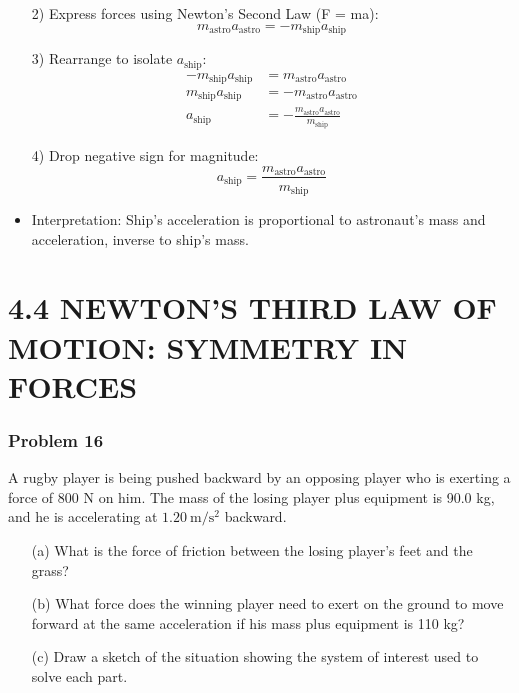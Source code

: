 \documentclass{beamer}
\begin{document}
\begin{}
\begin{frame}
\begin{itemize}
    \item[2)] Express forces using Newton's Second Law (F = ma):
    $$m_{\text{astro}} a_{\text{astro}} = -m_{\text{ship}} a_{\text{ship}}$$
    
    \item[3)] Rearrange to isolate $a_{\text{ship}}$:
    \begin{align*}
        -m_{\text{ship}} a_{\text{ship}} &= m_{\text{astro}} a_{\text{astro}} \\
        m_{\text{ship}} a_{\text{ship}} &= -m_{\text{astro}} a_{\text{astro}} \\
        a_{\text{ship}} &= -\frac{m_{\text{astro}} a_{\text{astro}}}{m_{\text{ship}}}
    \end{align*}
    
    \item[4)] Drop negative sign for magnitude:
    $$a_{\text{ship}} = \frac{m_{\text{astro}} a_{\text{astro}}}{m_{\text{ship}}}$$
    
    \item Interpretation: Ship's acceleration is proportional to astronaut's mass and acceleration, inverse to ship's mass.
\end{itemize}
\end{frame}

\section{4.4 NEWTON'S THIRD LAW OF MOTION: SYMMETRY IN FORCES}

\begin{frame}
\frametitle{Problem 16}
A rugby player is being pushed backward by an opposing player who is exerting a force of 800 N on him. The mass of the losing player plus equipment is 90.0 kg, and he is accelerating at $1.20 \mathrm{~m} / \mathrm{s}^{2}$ backward.
\begin{itemize}
    \item[(a)] What is the force of friction between the losing player's feet and the grass?
    \item[(b)] What force does the winning player need to exert on the ground to move forward at the same acceleration if his mass plus equipment is 110 kg?
    \item[(c)] Draw a sketch of the situation showing the system of interest used to solve each part.
\end{itemize}
\end{frame}


\end{}
\end{document}
